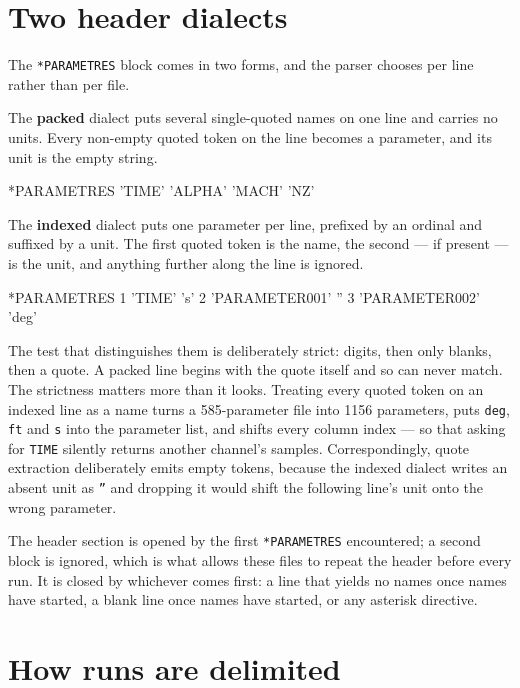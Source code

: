 \documentclass[11pt,a4paper,oneside]{report}
\newcommand{\code}[1]{\texttt{#1}}
\begin{document}
\section{Two header dialects}

The \code{*PARAMETRES} block comes in two forms, and the parser chooses per line
rather than per file.

The \textbf{packed} dialect puts several single-quoted names on one line and
carries no units. Every non-empty quoted token on the line becomes a parameter,
and its unit is the empty string.

\begin{aoecode}
*PARAMETRES
 'TIME'   'ALPHA'   'MACH'   'NZ'
\end{aoecode}

The \textbf{indexed} dialect puts one parameter per line, prefixed by an ordinal
and suffixed by a unit. The first quoted token is the name, the second --- if
present --- is the unit, and anything further along the line is ignored.

\begin{aoecode}
*PARAMETRES
      1 'TIME' 's'
      2 'PARAMETER001'  ''
      3 'PARAMETER002'  'deg'
\end{aoecode}

The test that distinguishes them is deliberately strict: digits, then only
blanks, then a quote. A packed line begins with the quote itself and so can never
match. The strictness matters more than it looks. Treating every quoted token on
an indexed line as a name turns a 585-parameter file into 1156 parameters, puts
\code{deg}, \code{ft} and \code{s} into the parameter list, and shifts every
column index --- so that asking for \code{TIME} silently returns another
channel's samples. Correspondingly, quote extraction deliberately emits empty
tokens, because the indexed dialect writes an absent unit as \code{''} and
dropping it would shift the following line's unit onto the wrong parameter.

The header section is opened by the first \code{*PARAMETRES} encountered; a
second block is ignored, which is what allows these files to repeat the header
before every run. It is closed by whichever comes first: a line that yields no
names once names have started, a blank line once names have started, or any
asterisk directive.

\section{How runs are delimited}
\end{document}
